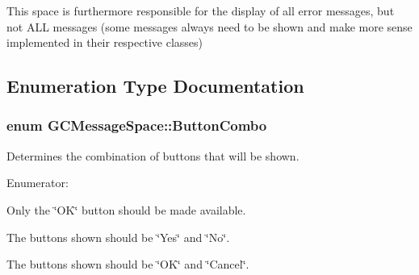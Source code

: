 \-This space is furthermore responsible for the display of all error messages, but not \-A\-L\-L messages (some messages always need to be shown and make more sense implemented in their respective classes) 

\subsection{\-Enumeration \-Type \-Documentation}
\hypertarget{namespace_g_c_message_space_ac1db082c29062fe6508ba03bf76bea44}{
\subsubsection[{\-Button\-Combo}]{\setlength{\rightskip}{0pt plus 5cm}enum {\bf \-G\-C\-Message\-Space\-::\-Button\-Combo}}}\label{namespace_g_c_message_space_ac1db082c29062fe6508ba03bf76bea44}


\-Determines the combination of buttons that will be shown. 

\begin{Desc}
\item[\-Enumerator\-: ]\par
\begin{description}
\item[{\em 
\hypertarget{namespace_g_c_message_space_ac1db082c29062fe6508ba03bf76bea44a3baa10aa8947d81b9001802c55131570}{\-O\-K\-Only}\label{namespace_g_c_message_space_ac1db082c29062fe6508ba03bf76bea44a3baa10aa8947d81b9001802c55131570}
}]\-Only the \char`\"{}\-O\-K\char`\"{} button should be made available. \item[{\em 
\hypertarget{namespace_g_c_message_space_ac1db082c29062fe6508ba03bf76bea44ab2defe87f3e886edf34f537f4ac8c282}{\-Yes\-No}\label{namespace_g_c_message_space_ac1db082c29062fe6508ba03bf76bea44ab2defe87f3e886edf34f537f4ac8c282}
}]\-The buttons shown should be \char`\"{}\-Yes\char`\"{} and \char`\"{}\-No\char`\"{}. \item[{\em 
\hypertarget{namespace_g_c_message_space_ac1db082c29062fe6508ba03bf76bea44a7de67bd6b388b96a468fcf8246dfdece}{\-O\-K\-Cancel}\label{namespace_g_c_message_space_ac1db082c29062fe6508ba03bf76bea44a7de67bd6b388b96a468fcf8246dfdece}
}]\-The buttons shown should be \char`\"{}\-O\-K\char`\"{} and \char`\"{}\-Cancel\char`\"{}. \end{description}
\end{Desc}



